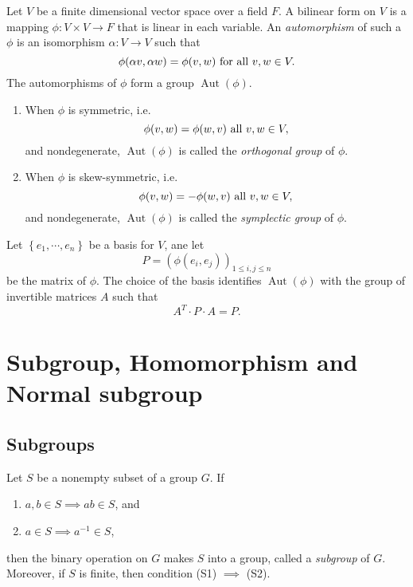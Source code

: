 \begin{example}
  Let \( V \) be a finite dimensional vector space over a field \( F \).
  A bilinear form on \( V \) is a mapping \( \phi: V \times V \to F \) that is linear in each variable.
  An \emph{automorphism} of such a \( \phi \) is an isomorphism \( \alpha: V \to V \) such that
  \[
    \phi(\alpha v, \alpha w) = \phi(v, w) \textmd{ for all } v, w \in V.
  \]
  The automorphisms of \( \phi \) form a group \( \operatorname{Aut}(\phi) \).
  \begin{enumerate}
    \item When \( \phi \) is symmetric, i.e.
      \[
        \phi(v, w) = \phi(w, v) \textmd{ all } v, w \in V,
      \]
      and nondegenerate, \( \operatorname{Aut}(\phi) \) is called the \emph{orthogonal group} of \( \phi \).
    \item When \( \phi \) is skew-symmetric, i.e.
      \[
        \phi(v, w) = - \phi(w, v) \textmd{ all } v, w\in V,
      \]
      and nondegenerate, \( \operatorname{Aut}(\phi) \) is called the \emph{symplectic group} of \( \phi \).
  \end{enumerate}
\end{example}
\begin{remark}
  Let \( \left\lbrace e_1, \cdots, e_n \right\rbrace \) be a basis for \( V \), ane let
  \[
    P = \left(\phi(e_i, e_j)\right)_{1 \leq i,j \leq n}
  \]
  be the matrix of \( \phi \).
  The choice of the basis identifies \( \operatorname{Aut}(\phi) \) with the group of invertible matrices \( A \) such that
  \[
    A^T \cdot P \cdot A = P.
  \]
\end{remark}

\section{Subgroup, Homomorphism and Normal subgroup}

\subsection{Subgroups}

\begin{proposition}
  Let \( S \) be a nonempty subset of a group \( G \).
  If
  \begin{enumerate}[label=(S\arabic*)]
    \item \( a, b \in S \implies ab \in S \), and
    \item \( a \in S \implies a^{-1} \in S \),
  \end{enumerate}
  then the binary operation on \( G \) makes \( S \) into a group, called a
  \emph{subgroup} of \( G \).
  Moreover, if \( S \) is finite, then condition (S1) \( \implies \) (S2).
\end{proposition}

